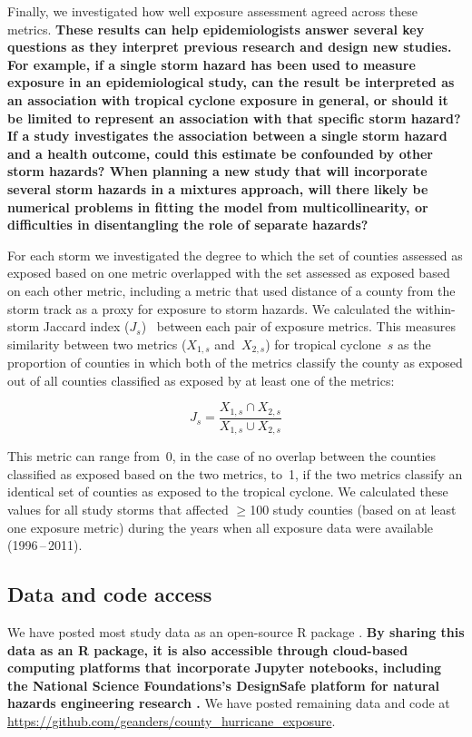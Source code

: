 Finally, we investigated how well exposure assessment agreed across these
metrics. \textbf{These results can help epidemiologists answer several key
questions as they interpret previous research and design new studies. For
example, if a single storm hazard has been used to measure exposure in an
epidemiological study, can the result be interpreted as an association with
tropical cyclone exposure in general, or should it be limited to represent an
association with that specific storm hazard? If a study investigates the
association between a single storm hazard and a health outcome, could this
estimate be confounded by other storm hazards? When planning a new study that
will incorporate several storm hazards in a mixtures approach, will there
likely be numerical problems in fitting the model from multicollinearity, or
difficulties in disentangling the role of separate hazards?}

For each storm we investigated the degree to which the set of counties assessed
as exposed based on one metric overlapped with the set assessed as exposed
based on each other metric, including a metric that used distance of a county
from the storm track as a proxy for exposure to storm hazards.  We calculated
the within-storm Jaccard index ($J_s$)~\parencite{jaccard1901distribution,
jaccard1908nouvelles} between each pair of exposure metrics. This measures
similarity between two metrics ($X_{1,s}$ and~$X_{2,s}$) for tropical
cyclone~$s$ as the proportion of counties in which both of the metrics classify
the county as exposed out of all counties classified as exposed by at least one
of the metrics:

\begin{equation} 
J_s = \frac{X_{1,s} \cap X_{2,s}}{X_{1,s} \cup X_{2,s}}
\end{equation}

\noindent This metric can range from~0, in the case of no overlap between the
counties classified as exposed based on the two metrics, to~1, if
the two metrics classify an identical set of counties as exposed to the
tropical cyclone. We calculated these values for all study storms that affected
$\ge$100 study counties (based on at least one exposure metric) during the
years when all exposure data were available (1996\,--\,2011).

\subsection*{Data and code access}

We have posted most study data as an open-source R package
\parencite{hurricaneexposuredata}. \textbf{By sharing this data as an R package, it
is also accessible through cloud-based computing platforms that
incorporate Jupyter notebooks, including the National Science Foundations's
DesignSafe platform for natural hazards engineering research
\parencite{rathje2017designsafe}.} We have posted remaining data and code at
\url{https://github.com/geanders/county_hurricane_exposure}.
